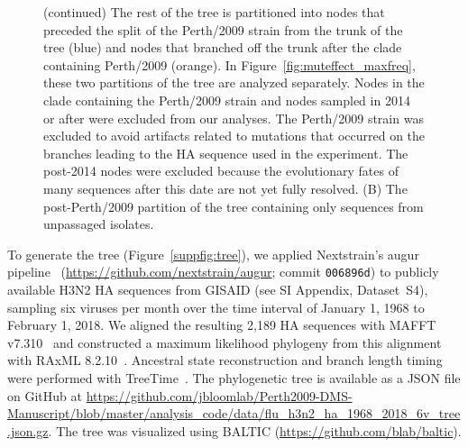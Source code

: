 \begin{figure}\ContinuedFloat
  \caption[{}]{(continued)
    The rest of the tree is partitioned into nodes that preceded the split of the Perth/2009 strain from the trunk of the tree (blue) and nodes that branched off the trunk after the clade containing Perth/2009 (orange).
    In Figure~\ref{fig:muteffect_maxfreq}, these two partitions of the tree are analyzed separately.
    Nodes in the clade containing the Perth/2009 strain and nodes sampled in 2014 or after were excluded from our analyses.
    The Perth/2009 strain was excluded to avoid artifacts related to mutations that occurred on the branches leading to the HA sequence used in the experiment.
    The post-2014 nodes were excluded because the evolutionary fates of many sequences after this date are not yet fully resolved.
    (B) The post-Perth/2009 partition of the tree containing only sequences from unpassaged isolates.
  }
\end{figure}

To generate the tree (Figure~\ref{suppfig:tree}), we applied Nextstrain's augur pipeline~\citep{Hadfield2018} (\url{https://github.com/nextstrain/augur}; commit \texttt{006896d}) to publicly available H3N2 HA sequences from GISAID \citep{shu2017gisaid} (see \citet{Lee2018} SI Appendix, Dataset~S4), sampling six viruses per month over the time interval of January 1, 1968 to February 1, 2018.
We aligned the resulting 2,189 HA sequences with MAFFT v7.310~\citep{katoh2013mafft} and constructed a maximum likelihood phylogeny from this alignment with RAxML 8.2.10~\citep{stamatakis2006raxml}.
Ancestral state reconstruction and branch length timing were performed with TreeTime~\citep{Sagulenko2018}.
The phylogenetic tree is available as a JSON file on GitHub at \url{https://github.com/jbloomlab/Perth2009-DMS-Manuscript/blob/master/analysis_code/data/flu_h3n2_ha_1968_2018_6v_tree.json.gz}.
The tree was visualized using BALTIC (\url{https://github.com/blab/baltic}).

\newcommand{\dx}{\mathrm{d}x}						%
\newcommand{\dy}{\mathrm{d}y}						%
\newcommand{\dt}{\mathrm{d}t}						%
\newcommand{\inertia}{\epsilon}			    %
\newcommand{\normal}{\mathcal{N}}				%

